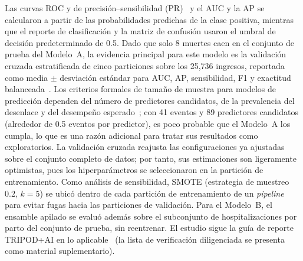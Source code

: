 \documentclass[healthcare,article,submit,pdftex,moreauthors]{Definitions/mdpi_es}
\begin{document}
Las curvas ROC y de precisión--sensibilidad (PR)~\cite{Fawcett2006ROC,Saito2015PR} y el AUC y la AP se calcularon a partir de las
probabilidades predichas de la clase positiva, mientras que el reporte de clasificación y la
matriz de confusión usaron el umbral de decisión predeterminado de 0.5. Dado que solo 8 muertes
caen en el conjunto de prueba del Modelo~A, la evidencia principal para este modelo es la
validación cruzada estratificada de cinco particiones sobre los 25{,}736 ingresos, reportada como
media $\pm$ desviación estándar para AUC, AP, sensibilidad, F1 y exactitud balanceada~\cite{Arlot2010CV}. Los criterios formales de tamaño de muestra para modelos de predicción dependen del número de predictores candidatos, de la prevalencia del desenlace y del desempeño esperado~\cite{Riley2020SampleSize}; con 41 eventos y 89 predictores candidatos (alrededor de 0.5 eventos por predictor), es poco probable que el Modelo~A los cumpla, lo que es una razón adicional para tratar sus resultados como exploratorios.
La validación cruzada reajusta las configuraciones ya ajustadas sobre el conjunto completo de datos;
por tanto, sus estimaciones son ligeramente optimistas, pues los hiperparámetros se seleccionaron
en la partición de entrenamiento. Como análisis de sensibilidad, SMOTE (estrategia de muestreo 0.2,
$k=5$) se ubicó dentro de cada partición de entrenamiento de un \emph{pipeline} para evitar fugas
hacia las particiones de validación. Para el Modelo~B, el ensamble apilado se evaluó además sobre el
subconjunto de hospitalizaciones por parto del conjunto de prueba, sin reentrenar.
El estudio sigue la guía de reporte TRIPOD+AI en lo aplicable~\cite{Collins2024TRIPODAI}
(la lista de verificación diligenciada se presenta como material suplementario).
\end{document}
